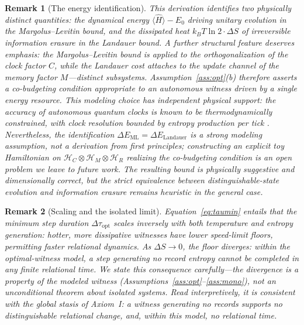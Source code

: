 \documentclass[11pt, a4paper]{article}
\newtheorem{remark}{Remark}
\begin{document}
\begin{remark}[The energy identification]
\label{rem:energy}
This derivation identifies two physically distinct quantities: the dynamical energy $\langle\hat{H}\rangle - E_0$ driving unitary evolution in the Margolus--Levitin bound, and the dissipated heat $k_B T \ln 2 \cdot \Delta S$ of irreversible information erasure in the Landauer bound. A further structural feature deserves emphasis: the Margolus--Levitin bound is applied to the orthogonalization of the \emph{clock} factor $C$, while the Landauer cost attaches to the update channel of the \emph{memory} factor $M$---distinct subsystems. Assumption~\ref{ass:opt}(b) therefore asserts a co-budgeting condition appropriate to an autonomous witness driven by a single energy resource. This modeling choice has independent physical support: the accuracy of autonomous quantum clocks is known to be thermodynamically constrained, with clock resolution bounded by entropy production per tick \cite{Erker2017}. Nevertheless, the identification $\Delta E_{\mathrm{ML}} = \Delta E_{\mathrm{Landauer}}$ is a strong modeling assumption, not a derivation from first principles; constructing an explicit toy Hamiltonian on $\mathcal{H}_C \otimes \mathcal{H}_M \otimes \mathcal{H}_R$ realizing the co-budgeting condition is an open problem we leave to future work. The resulting bound is physically suggestive and dimensionally correct, but the strict equivalence between distinguishable-state evolution and information erasure remains heuristic in the general case.
\end{remark}

\begin{remark}[Scaling and the isolated limit]
\label{rem:freeze}
Equation~\eqref{eq:taumin} entails that the minimum step duration $\Delta\tau_{\mathrm{opt}}$ scales inversely with both temperature and entropy generation: hotter, more dissipative witnesses have lower speed-limit floors, permitting faster relational dynamics. As $\Delta S \to 0$, the floor diverges: within the optimal-witness model, a step generating no record entropy cannot be completed in any finite relational time. We state this consequence carefully---the divergence is a property of the modeled witness (Assumptions~\ref{ass:opt}--\ref{ass:mono}), not an unconditional theorem about isolated systems. Read interpretively, it is consistent with the global stasis of Axiom~I: a witness generating no records supports no distinguishable relational change, and, within this model, no relational time.
\end{remark}
\end{document}
